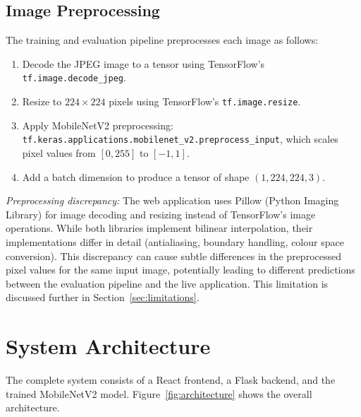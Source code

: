 \documentclass[conference]{IEEEtran}
\begin{document}
\subsection{Image Preprocessing}

The training and evaluation pipeline preprocesses each image as follows:
\begin{enumerate}
    \item Decode the JPEG image to a tensor using TensorFlow's \texttt{tf.image.decode\_jpeg}.
    \item Resize to $224 \times 224$ pixels using TensorFlow's \texttt{tf.image.resize}.
    \item Apply MobileNetV2 preprocessing: \texttt{tf.keras.applications.mobilenet\_v2.preprocess\_input}, which scales pixel values from $[0, 255]$ to $[-1, 1]$.
    \item Add a batch dimension to produce a tensor of shape $(1, 224, 224, 3)$.
\end{enumerate}

\textit{Preprocessing discrepancy:} The web application uses Pillow (Python Imaging Library) for image decoding and resizing instead of TensorFlow's image operations. While both libraries implement bilinear interpolation, their implementations differ in detail (antialiasing, boundary handling, colour space conversion). This discrepancy can cause subtle differences in the preprocessed pixel values for the same input image, potentially leading to different predictions between the evaluation pipeline and the live application. This limitation is discussed further in Section~\ref{sec:limitations}.

\section{System Architecture}
\label{sec:system}

The complete system consists of a React frontend, a Flask backend, and the trained MobileNetV2 model. Figure~\ref{fig:architecture} shows the overall architecture.
\end{document}
